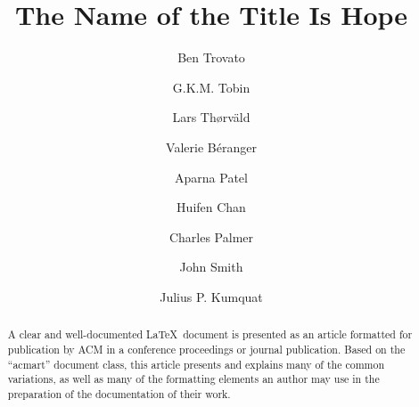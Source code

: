 \documentclass[acmsmall,natbib=false]{acmart}
\begin{document}
\title{The Name of the Title Is Hope}

\author{Ben Trovato}
\author{G.K.M. Tobin}
\authornotemark[1]

\author{Lars Th{\o}rv{\"a}ld}

\author{Valerie B\'eranger}

\author{Aparna Patel}

\author{Huifen Chan}

\author{Charles Palmer}

\author{John Smith}

\author{Julius P. Kumquat}

\renewcommand{\shortauthors}{Trovato et al.}

\begin{abstract}
    A clear and well-documented \LaTeX\ document is presented as an
    article formatted for publication by ACM in a conference proceedings
    or journal publication. Based on the ``acmart'' document class, this
    article presents and explains many of the common variations, as well
    as many of the formatting elements an author may use in the
    preparation of the documentation of their work.
\end{abstract}
\end{document}
